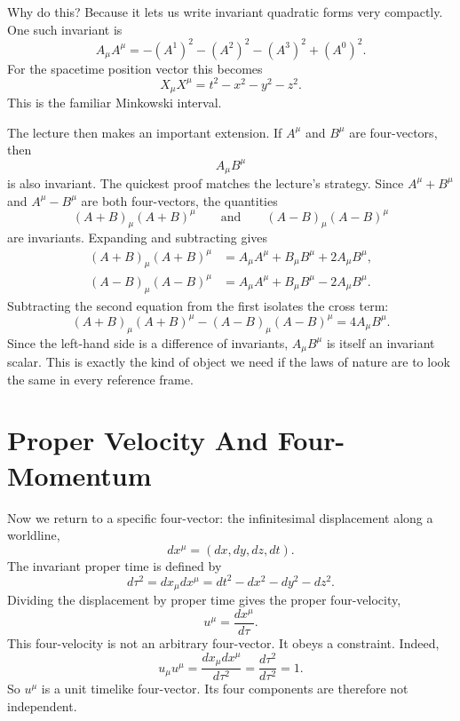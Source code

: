 Why do this? Because it lets us write invariant quadratic forms very compactly. One such invariant is
\begin{equation}
A_{\mu}A^{\mu}=-\left(A^1\right)^2-\left(A^2\right)^2-\left(A^3\right)^2+\left(A^0\right)^2.
\end{equation}
For the spacetime position vector this becomes
\begin{equation}
X_{\mu}X^{\mu}=t^2-x^2-y^2-z^2.
\end{equation}
This is the familiar Minkowski interval.

The lecture then makes an important extension. If \(A^\mu\) and \(B^\mu\) are four-vectors, then
\begin{equation}
A_{\mu}B^{\mu}
\end{equation}
is also invariant. The quickest proof matches the lecture's strategy. Since \(A^\mu+B^\mu\) and \(A^\mu-B^\mu\) are both four-vectors, the quantities
\[
(A+B)_\mu(A+B)^\mu
\qquad\text{and}\qquad
(A-B)_\mu(A-B)^\mu
\]
are invariants. Expanding and subtracting gives
\begin{align}
(A+B)_\mu(A+B)^\mu&=A_\mu A^\mu+B_\mu B^\mu+2A_\mu B^\mu,\\
(A-B)_\mu(A-B)^\mu&=A_\mu A^\mu+B_\mu B^\mu-2A_\mu B^\mu.
\end{align}
Subtracting the second equation from the first isolates the cross term:
\begin{equation}
(A+B)_\mu(A+B)^\mu-(A-B)_\mu(A-B)^\mu=4A_\mu B^\mu.
\end{equation}
Since the left-hand side is a difference of invariants, \(A_\mu B^\mu\) is itself an invariant scalar. This is exactly the kind of object we need if the laws of nature are to look the same in every reference frame.

\section{Proper Velocity And Four-Momentum}

Now we return to a specific four-vector: the infinitesimal displacement along a worldline,
\[
dx^\mu=(dx,dy,dz,dt).
\]
The invariant proper time is defined by
\begin{equation}
d\tau^2=dx_\mu dx^\mu=dt^2-dx^2-dy^2-dz^2.
\end{equation}
Dividing the displacement by proper time gives the proper four-velocity,
\begin{equation}
u^\mu=\frac{dx^\mu}{d\tau}.
\end{equation}
This four-velocity is not an arbitrary four-vector. It obeys a constraint. Indeed,
\begin{equation}
u_\mu u^\mu
=
\frac{dx_\mu dx^\mu}{d\tau^2}
=
\frac{d\tau^2}{d\tau^2}
=
1.
\end{equation}
So \(u^\mu\) is a unit timelike four-vector. Its four components are therefore not independent.

